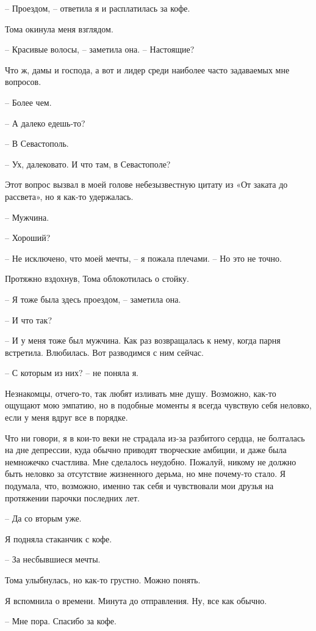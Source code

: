 \documentclass[
]{book}
\begin{document}
-- Проездом, -- ответила я и расплатилась за кофе.

Тома окинула меня взглядом.

-- Красивые волосы, -- заметила она. -- Настоящие?

Что ж, дамы и господа, а вот и лидер среди наиболее часто задаваемых мне вопросов.

-- Более чем.

-- А далеко едешь-то?

-- В Севастополь.

-- Ух, далековато. И что там, в Севастополе?

Этот вопрос вызвал в моей голове небезызвестную цитату из «От заката до рассвета», но я как-то удержалась.

-- Мужчина.

-- Хороший?

-- Не исключено, что моей мечты, -- я пожала плечами. -- Но это не точно.

Протяжно вздохнув, Тома облокотилась о стойку.

-- Я тоже была здесь проездом, -- заметила она.

-- И что так?

-- И у меня тоже был мужчина. Как раз возвращалась к нему, когда парня встретила. Влюбилась. Вот разводимся с ним сейчас.

-- С которым из них? -- не поняла я.

Незнакомцы, отчего-то, так любят изливать мне душу. Возможно, как-то ощущают мою эмпатию, но в подобные моменты я всегда чувствую себя неловко, если у меня вдруг все в порядке.

Что ни говори, я в кои-то веки не страдала из-за разбитого сердца, не болталась на дне депрессии, куда обычно приводят творческие амбиции, и даже была немножечко счастлива. Мне сделалось неудобно. Пожалуй, никому не должно быть неловко за отсутствие жизненного дерьма, но мне почему-то стало. Я подумала, что, возможно, именно так себя и чувствовали мои друзья на протяжении парочки последних лет.

-- Да со вторым уже.

Я подняла стаканчик с кофе.

-- За несбывшиеся мечты.

Тома улыбнулась, но как-то грустно. Можно понять.

Я вспомнила о времени. Минута до отправления. Ну, все как обычно.

-- Мне пора. Спасибо за кофе.
\end{document}
